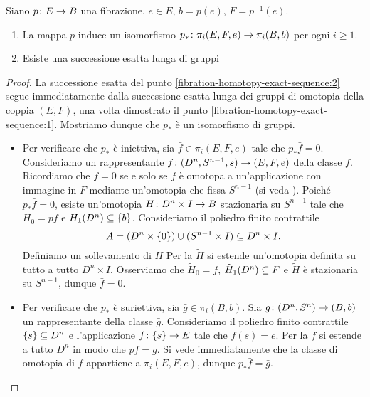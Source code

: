 \begin{proposition}
Siano $\map{p}{E}{B}$ una fibrazione, $e\in E$, $b=p(e)$, $F=p^{-1}(e)$.
\begin{enumerate}
\item\label{fibration-homotopy-exact-sequence:1} La mappa $p$ induce un isomorfismo $\map{p_*}{\pi_i(E,F,e)}{\pi_i(B,b)}$ per ogni $i\ge 1$.
\item\label{fibration-homotopy-exact-sequence:2} Esiste una successione esatta lunga di gruppi
\end{enumerate}
\end{proposition}
\begin{proof}
La successione esatta del punto \ref{fibration-homotopy-exact-sequence:2} segue immediatamente dalla successione esatta lunga dei gruppi di omotopia della coppia $(E,F)$, una volta dimostrato il punto \ref{fibration-homotopy-exact-sequence:1}. Mostriamo dunque che $p_*$ è un isomorfismo di gruppi.
\begin{itemize}
\item Per verificare che $p_*$ è iniettiva, sia $\bar{f}\in\pi_i(E,F,e)$ tale che $p_*\bar{f}=0$. Consideriamo un rappresentante $\map{f}{(D^n,S^{n-1},s)}{(E,F,e)}$ della classe $\bar{f}$. Ricordiamo che $\bar{f}=0$ se e solo se $f$ è omotopa a un'applicazione con immagine in $F$ mediante un'omotopia che fissa $S^{n-1}$ (si veda ). Poiché $p_*\bar{f}=0$, esiste un'omotopia $\map{H}{D^n\times I}{B}$ stazionaria su $S^{n-1}$ tale che $H_0=pf$ e $H_1(D^n)\subseteq\{b\}$. Consideriamo il poliedro finito contrattile 
$$
A=(D^n\times\{0\})\cup(S^{n-1}\times I)\subseteq D^n\times I.
$$
Definiamo un sollevamento di $H$
Per la  $\tilde{H}$ si estende un'omotopia definita su tutto a tutto $D^n\times I$. Osserviamo che $\tilde{H}_0=f$, $\tilde{H}_1(D^n)\subseteq F$ e $\tilde{H}$ è stazionaria su $S^{n-1}$, dunque $\bar{f}=0$.
\item Per verificare che $p_*$ è suriettiva, sia $\bar{g}\in\pi_i(B,b)$. Sia $\map{g}{(D^n,S^n)}{(B,b)}$ un rappresentante della classe $\bar{g}$. Consideriamo il poliedro finito contrattile $\{s\}\subseteq D^n$ e l'applicazione $\map{f}{\{s\}}{E}$ tale che $f(s)=e$. Per la  $f$ si estende a tutto $D^n$ in modo che $pf=g$. Si vede immediatamente che la classe di omotopia di $f$ appartiene a $\pi_i(E,F,e)$, dunque $p_*\bar{f}=\bar{g}$.\qedhere
\end{itemize}
\end{proof}

